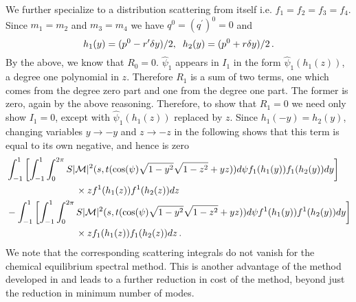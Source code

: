 We further specialize to a distribution scattering from itself i.e. $f_1=f_2=f_3=f_4$.  Since $m_1=m_2$ and $m_3=m_4$ we have $q^0=(q^{\prime})^0=0$ and
\begin{equation}
h_1(y)=(p^0-r^{\prime}\delta y)/2,\hspace{2mm} h_2(y)=(p^0+r\delta y)/2\,.
\end{equation}
 By the above, we know that $R_0=0$.  $\hat\psi_1$ appears in $I_1$ in the form $\hat\psi_1(h_1(z))$, a degree one polynomial in $z$.  Therefore $R_1$ is a sum of two terms, one which comes from the degree zero part and one from the degree one part.  The former is zero, again by the above reasoning.  Therefore, to show that $R_1=0$ we need only show $I_1=0$, except with $\hat\psi_1(h_1(z))$ replaced by  $z$.  Since $h_1(-y)=h_2(y)$, changing variables  $y\rightarrow -y$ and $z\rightarrow -z$ in the following shows that this term is equal to its own negative, and hence is zero
\begin{align}
&\int_{-1}^1 \left[\int_{-1}^1\int_0^{2\pi}S|\mathcal{M}|^2 (s,t(\cos(\psi)\sqrt{1-y^2}\sqrt{1-z^2}+yz))d\psi f_1(h_1(y))f_1(h_2(y)) dy\right] \notag\\
&\hspace{26mm}\times  zf^1(h_1(z))f^1(h_2(z))dz\\
&-\int_{-1}^1 \left[\int_{-1}^1\int_0^{2\pi}S|\mathcal{M}|^2 (s,t(\cos(\psi)\sqrt{1-y^2}\sqrt{1-z^2}+yz))d\psi f^1(h_1(y))f^1(h_2(y)) dy\right] \notag\\
&\hspace{26mm}\times zf_{1}(h_1(z))f_1(h_2(z))dz\,.\notag
\end{align}
We note that the corresponding scattering integrals do not vanish for the chemical equilibrium spectral method.  This is another advantage of the method developed in  and leads to a further reduction in cost of the method, beyond just the reduction in minimum number of modes.

